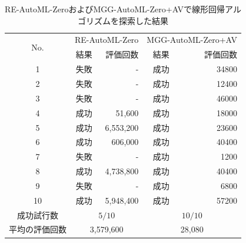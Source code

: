 \documentclass[11pt,oneside,openany,report]{jsbook}
\begin{document}
\begin{table}[tbp]
  \caption{RE-AutoML-ZeroおよびMGG-AutoML-Zero+AVで線形回帰アルゴリズムを探索した結果}
  \label{table:mgg_automl_zero_av:compare_exp}
  \centering
  \begin{tabular}{|c|cr|cr|}
    \hline
    \multirow{2}{*}{No. }
            & \multicolumn{2}{c|}{RE-AutoML-Zero} & \multicolumn{2}{c|}{MGG-AutoML-Zero+AV}              \\
            & 結果                                  & 評価回数                                    & 結果 & 評価回数  \\
    \hline \hline
    1       & 失敗                                  & -                                       & 成功 & 34800 \\
    2       & 失敗                                  & -                                       & 成功 & 12400 \\
    3       & 失敗                                  & -                                       & 成功 & 46000 \\
    4       & 成功                                  & 51,600                                  & 成功 & 18000 \\
    5       & 成功                                  & 6,553,200                               & 成功 & 23600 \\
    6       & 成功                                  & 606,000                                 & 成功 & 40400 \\
    7       & 失敗                                  & -                                       & 成功 & 1200  \\
    8       & 成功                                  & 4,738,800                               & 成功 & 40400 \\
    9       & 失敗                                  & -                                       & 成功 & 6800  \\
    10      & 成功                                  & 5,948,400                               & 成功 & 57200 \\
    \hline
    成功試行数   & \multicolumn{2}{c|}{$5/10$}         & \multicolumn{2}{c|}{$10/10$}                         \\
    \hline
    平均の評価回数 & \multicolumn{2}{c|}{3,579,600}      & \multicolumn{2}{c|}{28,080}                          \\
    \hline
  \end{tabular}
\end{table}
\end{document}
